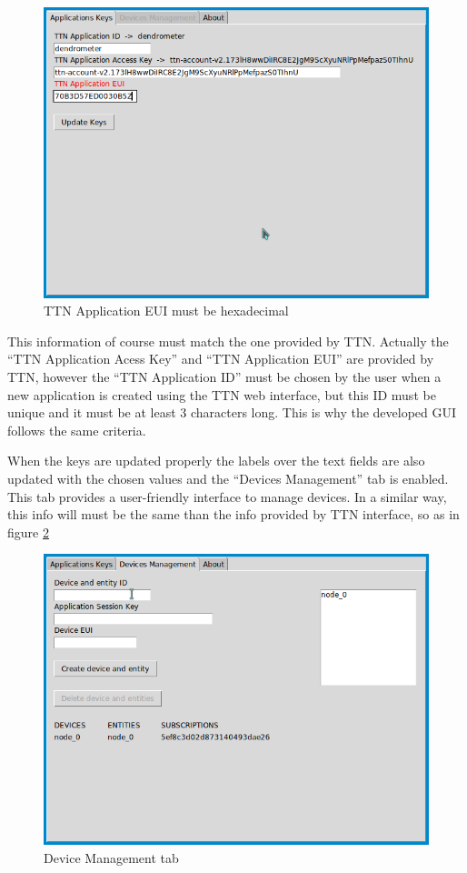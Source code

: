 \documentclass[11pt,a4paper,dvipsnames,twoside]{article}
\begin{document}
\begin{figure}[ht]
  \centering
  \includegraphics[width=.9\textwidth]{../pictures/GUI_app_keys_fail.png}
  \caption{TTN Application EUI must be hexadecimal} 
  \label{fig:GUI_app_keys_fail}
\end{figure}

This information of course must match the one provided by TTN. Actually the \enquote{TTN Application Acess Key} and \enquote{TTN Application EUI} are provided by TTN, however the \enquote{TTN Application ID} must be chosen by the user when a new application is created using the TTN web interface, but this ID must be unique and it must be at least 3 characters long. This is why the developed GUI follows the same criteria.

When the keys are updated properly the labels over the text fields are also updated with the chosen values and the \enquote{Devices Management} tab is enabled. This tab provides a user-friendly interface to manage devices. In a similar way, this info will must be the same than the info provided by TTN interface, so as in figure \ref{fig:device_management_tab}

\begin{figure}[ht]
  \centering
  \includegraphics[width=.9\textwidth]{../pictures/GUI_device_management.png}
  \caption{Device Management tab}
  \label{fig:device_management_tab}
\end{figure}
\end{document}
